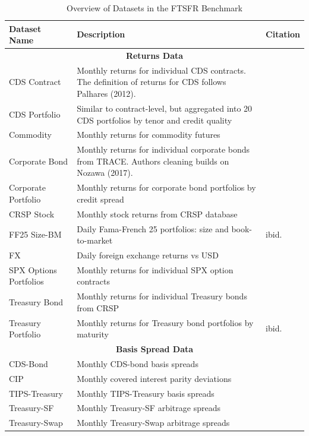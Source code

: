 \documentclass{article}
\begin{document}
\begin{table}[htbp]
\centering
\caption{Overview of Datasets in the FTSFR Benchmark}
\label{tab:datasets}
\footnotesize
\begin{tabular}{p{3cm}p{6cm}p{3.5cm}}
\toprule
Dataset Name & Description & Citation \\ 
\midrule
\multicolumn{3}{c}{\textbf{Returns Data}} \\
\midrule
CDS Contract & Monthly returns for individual CDS contracts. The definition of returns for CDS follows Palhares (2012). & \cite{Palhares2012} \\
CDS Portfolio & Similar to contract-level, but aggregated into 20 CDS portfolios by tenor and credit quality & \cite{He2017} \\
Commodity & Monthly returns for commodity futures & \cite{Yang2013} \\
Corporate Bond & Monthly returns for individual corporate bonds from TRACE. Authors cleaning builds on Nozawa (2017). & \cite{Dickerson2024} \\
Corporate Portfolio & Monthly returns for corporate bond portfolios by credit spread & \cite{Nozawa2017} \\
CRSP Stock & Monthly stock returns from CRSP database & \cite{Fama1993} \\
FF25 Size-BM & Daily Fama-French 25 portfolios: size and book-to-market & ibid. \\
FX & Daily foreign exchange returns vs USD & \cite{Lettau2014} \\
SPX Options Portfolios & Monthly returns for individual SPX option contracts & \cite{Constantinides2013} \\
Treasury Bond & Monthly returns for individual Treasury bonds from CRSP & \cite{Gurkaynak2007} \\
Treasury Portfolio & Monthly returns for Treasury bond portfolios by maturity & ibid. \\
\midrule
\multicolumn{3}{c}{\textbf{Basis Spread Data}} \\
\midrule
CDS-Bond & Monthly CDS-bond basis spreads & \cite{Siriwardane2021} \\
CIP & Monthly covered interest parity deviations & \cite{Du2018} \\
TIPS-Treasury & Monthly TIPS-Treasury basis spreads & \cite{Fleckenstein2014} \\
Treasury-SF & Monthly Treasury-SF arbitrage spreads & \cite{Fleckenstein2020} \\
Treasury-Swap & Monthly Treasury-Swap arbitrage spreads & \cite{Siriwardane2021} \\

\end{tabular}
\end{table}
\end{document}
